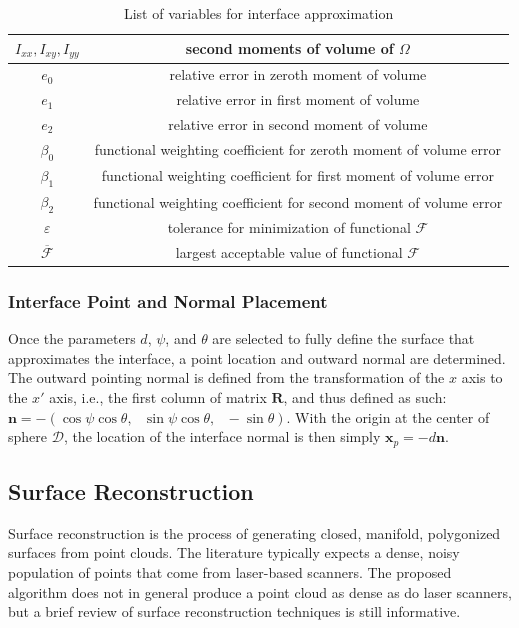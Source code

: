 \begin{table}[htbp!]
\begin{tabular}{|c||c|}
   $I_{xx}, I_{xy}, I_{yy}$ & second moments of volume of $\Omega$ \\ \hline
   $e_0$ & relative error in zeroth moment of volume \\ \hline
   $e_1$ & relative error in first moment of volume \\ \hline
   $e_2$ & relative error in second moment of volume \\ \hline   
   $\beta_0$ & functional weighting coefficient for zeroth moment of volume error \\ \hline
   $\beta_1$ & functional weighting coefficient for first moment of volume error \\ \hline
   $\beta_2$ & functional weighting coefficient for second moment of volume error \\ \hline 
   $\varepsilon$ & tolerance for minimization of functional $\mathcal{F}$ \\ \hline
   $\overline{\mathcal{F}}$ \rule{0mm}{4mm} & largest acceptable value of functional $\mathcal{F}$ \\ \hline        
\end{tabular}
\caption{List of variables for interface approximation}
\label{tab:surface}
\end{table}

\subsubsection{Interface Point and Normal Placement}

Once the parameters $d$, $\psi$, and $\theta$ are selected to fully define the surface that approximates the interface, a point location and outward normal are determined. The outward pointing normal is defined from the transformation of the $x$ axis to the $x'$ axis, i.e., the first column of matrix $\bm{R}$, and thus defined as such: $\bm{n} = -(\cos\psi\cos\theta,\text{\ }\sin\psi\cos\theta,\text{\ }-\sin\theta)$. With the origin at the center of sphere $\mathcal{D}$, the location of the interface normal is then simply $\mathbf{x}_p = -d\bm{n}$.

\subsection{Surface Reconstruction}
\label{Surface Reconstruction}

Surface reconstruction is the process of generating closed, manifold, polygonized surfaces from point clouds. The literature typically expects a dense, noisy population of points that come from laser-based scanners. The proposed algorithm does not in general produce a point cloud as dense as do laser scanners, but a brief review of surface reconstruction techniques is still informative.

